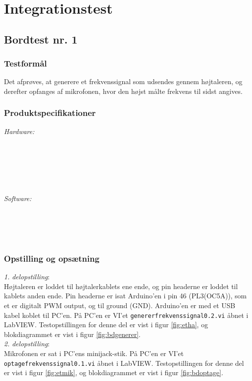 \section{Integrationstest}

	\subsection{Bordtest nr. 1} %
	\label{bordtest1}
		\subsubsection{Testformål}
		Det afprøves, at generere et frekvenssignal som udsendes gennem højtaleren, og derefter opfanges af mikrofonen, hvor den højst målte frekvens til sidst angives.  
		\subsubsection{Produktspecifikationer}
		
		\textit{Hardware:}\\
		\\
		\\
		\pins\\
		\arduino\\
		\PC\\
		\usbkabel\\
	
		\textit{Software:}\\
		\labview\\
		\visa\\
		\vi\\
		\ardsw\
		
		\subsubsection{Opstilling og opsætning}
		\textit{1. delopstilling}:\\
		Højtaleren er loddet til højtalerkablets ene ende, og pin headerne er loddet til kablets anden ende. 
		Pin headerne er isat Arduino'en i pin 46 (PL3(OC5A)), som et er digitalt PWM output, og til ground (GND). 
		Arduino'en er med et USB kabel koblet til PC'en. 		
		På PC'en er VI'et \texttt{genererfrekvenssignal0.2.vi} åbnet i LabVIEW. Testopstillingen for denne del er vist i figur \ref{fig:etha}, og blokdiagrammet er vist i figur \ref{fig:bdgenerer}.\\ 
 
		\textit{2. delopstilling}:\\
		Mikrofonen er sat i PC'ens minijack-stik. På PC'en er VI'et \texttt{optagefrekvenssignal0.1.vi} åbnet i LabVIEW. Testopstillingen for denne del er vist i figur \ref{fig:etmik}, og blokdiagrammet er vist i figur \ref{fig:bdoptage}.\\ 
		
